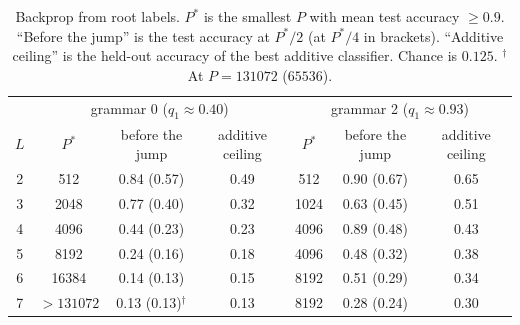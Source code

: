\documentclass[11pt]{article}
\theoremstyle{definition}
\begin{document}
\begin{table}[h]\centering
\caption{Backprop from root labels. $P^*$ is the smallest $P$ with mean test accuracy $\ge0.9$.
``Before the jump'' is the test accuracy at $P^*/2$ (at $P^*/4$ in brackets). ``Additive ceiling'' is
the held-out accuracy of the best additive classifier. Chance is $0.125$. $^\dagger$At $P=131072$
($65536$).}\label{tab:claim2exp}
\small\begin{tabular}{c|ccc|ccc}\toprule
& \multicolumn{3}{c|}{grammar 0 ($q_1\approx0.40$)} & \multicolumn{3}{c}{grammar 2 ($q_1\approx0.93$)}\\
$L$ & $P^*$ & before the jump & additive ceiling & $P^*$ & before the jump & additive ceiling\\\midrule
2 & 512 & 0.84 (0.57) & 0.49 & 512 & 0.90 (0.67) & 0.65\\
3 & 2048 & 0.77 (0.40) & 0.32 & 1024 & 0.63 (0.45) & 0.51\\
4 & 4096 & 0.44 (0.23) & 0.23 & 4096 & 0.89 (0.48) & 0.43\\
5 & 8192 & 0.24 (0.16) & 0.18 & 4096 & 0.48 (0.32) & 0.38\\
6 & 16384 & 0.14 (0.13) & 0.15 & 8192 & 0.51 (0.29) & 0.34\\
7 & $>131072$ & 0.13 (0.13)$^\dagger$ & 0.13 & 8192 & 0.28 (0.24) & 0.30\\
\bottomrule\end{tabular}
\end{table}
\end{document}

